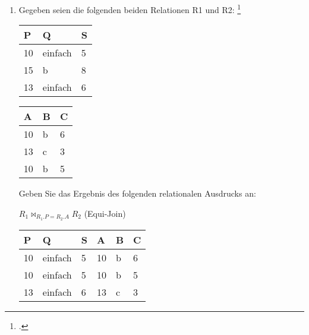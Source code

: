 \documentclass{bschlangaul-aufgabe}
\begin{document}

\begin{enumerate}


\item Gegeben seien die folgenden beiden Relationen R1 und R2:
\footcite{examen:66116:2021:03}


\begin{tabular}{|l|l|l|}
\hline
P  & Q       & S \\ \hline
10 & einfach & 5 \\ \hline
15 & b       & 8 \\ \hline
13 & einfach & 6 \\ \hline
\end{tabular}


\begin{tabular}{|l|l|l|}
\hline
A  & B & C \\ \hline
10 & b & 6 \\ \hline
13 & c & 3 \\ \hline
10 & b & 5 \\ \hline
\end{tabular}

Geben Sie das Ergebnis des folgenden relationalen Ausdrucks an:

\begin{center}
$R_1 \bowtie_ {R_1.P = R_2.A} R_2$ (Equi-Join)
\end{center}

\begin{bAntwort}
\begin{tabular}{|l|l|l|l|l|l|}
\hline
P  & Q       & S & A  & B & C \\ \hline
10 & einfach & 5 & 10 & b & 6 \\ \hline
10 & einfach & 5 & 10 & b & 5 \\ \hline
13 & einfach & 6 & 13 & c & 3 \\ \hline
\end{tabular}
\end{bAntwort}


\end{enumerate}
\end{document}
